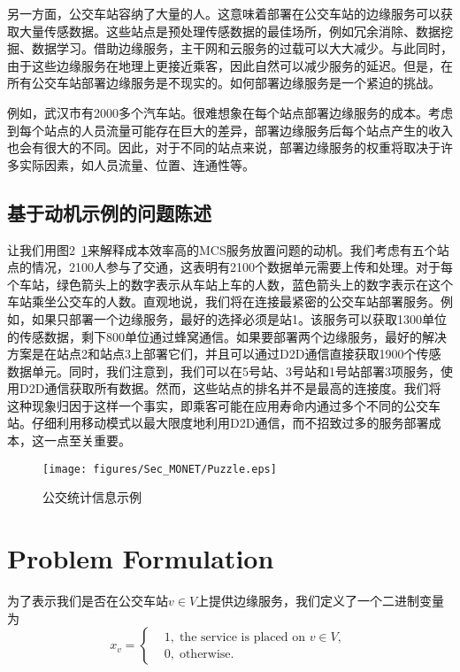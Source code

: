 另一方面，公交车站容纳了大量的人。这意味着部署在公交车站的边缘服务可以获取大量传感数据。这些站点是预处理传感数据的最佳场所，例如冗余消除、数据挖掘、数据学习。借助边缘服务，主干网和云服务的过载可以大大减少。与此同时，由于这些边缘服务在地理上更接近乘客，因此自然可以减少服务的延迟。但是，在所有公交车站部署边缘服务是不现实的。如何部署边缘服务是一个紧迫的挑战。


例如，武汉市有2000多个汽车站。很难想象在每个站点部署边缘服务的成本。考虑到每个站点的人员流量可能存在巨大的差异，部署边缘服务后每个站点产生的收入也会有很大的不同。因此，对于不同的站点来说，部署边缘服务的权重将取决于许多实际因素，如人员流量、位置、连通性等。

\subsection{基于动机示例的问题陈述}

让我们用图2~\ref{Figure_puzzle}来解释成本效率高的MCS服务放置问题的动机。我们考虑有五个站点的情况，2100人参与了交通，这表明有2100个数据单元需要上传和处理。对于每个车站，绿色箭头上的数字表示从车站上车的人数，蓝色箭头上的数字表示在这个车站乘坐公交车的人数。直观地说，我们将在连接最紧密的公交车站部署服务。例如，如果只部署一个边缘服务，最好的选择必须是站1。该服务可以获取1300单位的传感数据，剩下800单位通过蜂窝通信。如果要部署两个边缘服务，最好的解决方案是在站点2和站点3上部署它们，并且可以通过D2D通信直接获取1900个传感数据单元。同时，我们注意到，我们可以在5号站、3号站和1号站部署3项服务，使用D2D通信获取所有数据。然而，这些站点的排名并不是最高的连接度。我们将这种现象归因于这样一个事实，即乘客可能在应用寿命内通过多个不同的公交车站。仔细利用移动模式以最大限度地利用D2D通信，而不招致过多的服务部署成本，这一点至关重要。

\begin{figure}[!h]
\centering
\texttt{[image: figures/Sec\_MONET/Puzzle.eps]}
\caption{公交统计信息示例}
\label{Figure_puzzle}
\end{figure}

\section{Problem Formulation}

为了表示我们是否在公交车站$v\in V$上提供边缘服务，我们定义了一个二进制变量为
\[
x_v =\left\{
\begin{aligned}
&1, \; \text{the service is placed on $v\in V$, }\\
&0, \; \text{otherwise}.
\end{aligned}
\right.
\]

